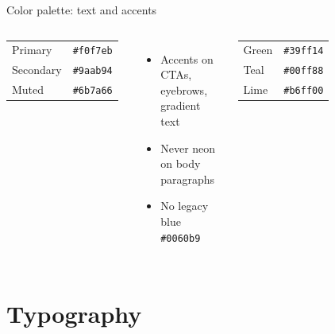 \documentclass[aspectratio=169,10pt]{beamer}
\begin{document}
\begin{frame}{Color palette: text and accents}
  \begin{columns}[T,onlytextwidth]
    \vspace{0.4em}
    \begin{tabular}{@{}ll@{}}
      Primary & \texttt{\#f0f7eb} \\
      Secondary & \texttt{\#9aab94} \\
      Muted & \texttt{\#6b7a66} \\
    \end{tabular}

    \vspace{0.8em}
    \vspace{0.4em}
    \begin{itemize}
      \item Accents on CTAs, eyebrows, gradient text
      \item Never neon on body paragraphs
      \item No legacy blue \texttt{\#0060b9}
    \end{itemize}

    \vspace{0.4em}
    \begin{tabular}{@{}ll@{}}
      Green & \texttt{\#39ff14} \\
      Teal & \texttt{\#00ff88} \\
      Lime & \texttt{\#b6ff00} \\
    \end{tabular}

    \vspace{0.6em}
    \begin{columns}[c,onlytextwidth]
      \centering\colorbox{collinsGreen}{\rule{0pt}{1.1cm}\rule{1.4cm}{0pt}}
      \centering\colorbox{collinsTeal}{\rule{0pt}{1.1cm}\rule{1.4cm}{0pt}}
      \centering\colorbox{collinsLime}{\rule{0pt}{1.1cm}\rule{1.4cm}{0pt}}
    \end{columns}
  \end{columns}
\end{frame}

\section{Typography}
\end{document}
